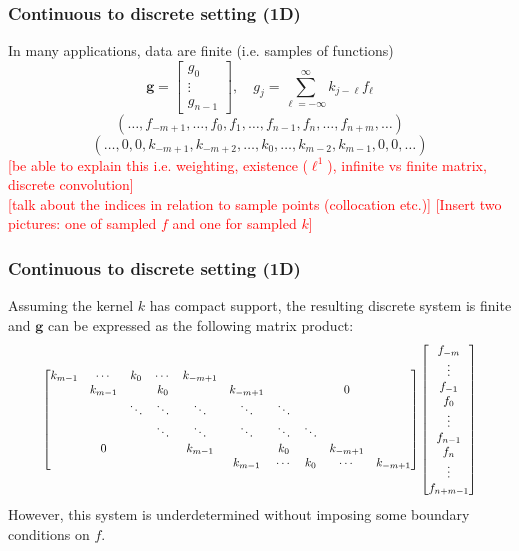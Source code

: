 \documentclass{beamer}
\newcommand{\ToDo}[1]{\textcolor{red}{[#1]}}
\newcommand{\gVec}{\mathbf{g}}	%
\begin{document}
\begin{frame}
\frametitle{Continuous to discrete setting (1D)}
In many applications, data are finite (i.e. samples of functions)
\[\gVec = \begin{bmatrix}
g_0 \\
\vdots \\
g_{n-1}
\end{bmatrix}, \quad g_j = \sum_{\ell=-\infty}^{\infty} k_{j-\ell}f_{\ell}\]
\[(\ldots,f_{-m+1},\ldots,f_0,f_1,\ldots,f_{n-1},f_n,\ldots,f_{n+m},\ldots)\]
\[(\ldots,0,0,k_{-m+1},k_{-m+2},\ldots,k_0,\ldots,k_{m-2},k_{m-1},0,0,\ldots)\]
\ToDo{be able to explain this i.e. weighting, existence ($\ell^1$), infinite vs finite matrix, discrete convolution} \\
\ToDo{talk about the indices in relation to sample points (collocation etc.)}
\ToDo{Insert two pictures: one of sampled $f$ and one for sampled $k$}
\end{frame}

\begin{frame}
\frametitle{Continuous to discrete setting (1D)}
Assuming the kernel $k$ has compact support, the resulting discrete system is finite and $\gVec$ can be expressed as the following matrix product:
\[\resizebox{.9 \textwidth}{!}{$
\begin{bmatrix}
k_{m-1} & \cdots & k_0 & \cdots & k_{-m+1} & & & & & \\
 & k_{m-1} & & k_0 & & k_{-m+1} & & & 0 & \\
 & & \ddots & \ddots & \ddots & \ddots & \ddots & & & \\
 & & & \ddots & \ddots & \ddots & \ddots & \ddots & & \\
 & 0 & & & k_{m-1} & & k_0 & & k_{-m+1} & \\
 & & & & & k_{m-1} & \cdots & k_0 & \cdots & k_{-m+1}
\end{bmatrix}\begin{bmatrix}
f_{-m} \\
\vdots \\
f_{-1} \\
f_0 \\
\vdots \\
f_{n-1} \\
f_n \\
\vdots \\
f_{n+m-1}
\end{bmatrix}$}\]
However, this system is underdetermined without imposing some boundary conditions on $f$.
\end{frame}
\end{document}
